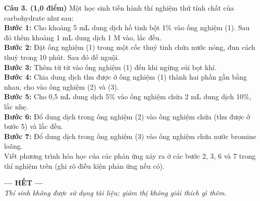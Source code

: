 \documentclass[11pt,a4paper]{article}
\begin{document}
\vspace{6pt}

\vspace{6pt}
\noindent\textbf{Câu 3. (1,0 điểm)} Một học sinh tiến hành thí nghiệm thử tính chất của carbohydrate như sau:\\
\textbf{Bước 1:} Cho khoảng 5 mL dung dịch hồ tinh bột 1\% vào ống nghiệm (1). Sau đó thêm khoảng 1 mL dung dịch  1 M vào, lắc đều.\\
\textbf{Bước 2:} Đặt ống nghiệm (1) trong một cốc thuỷ tinh chứa nước nóng, đun cách thuỷ trong 10 phút. Sau đó để nguội.\\
\textbf{Bước 3:} Thêm từ từ  vào ống nghiệm (1) đến khi ngừng sủi bọt khí.\\
\textbf{Bước 4:} Chia dung dịch thu được ở ống nghiệm (1) thành hai phần gần bằng nhau, cho vào ống nghiệm (2) và (3).\\
\textbf{Bước 5:} Cho 0,5 mL dung dịch  5\% vào ống nghiệm chứa 2 mL dung dịch  10\%, lắc nhẹ.\\
\textbf{Bước 6:} Đổ dung dịch trong ống nghiệm (2) vào ống nghiệm chứa  (thu được ở bước 5) và lắc đều.\\
\textbf{Bước 7:} Đổ dung dịch trong ống nghiệm (3) vào ống nghiệm chứa nước bromine loãng.\\
Viết phương trình hóa học của các phản ứng xảy ra ở các bước 2, 3, 6 và 7 trong thí nghiệm trên (ghi rõ điều kiện phản ứng nếu có).

\vspace{6pt}

\vspace{8pt}
\begin{center}
\textbf{--- HẾT ---} \\
\textit{\small Thí sinh không được sử dụng tài liệu; giám thị không giải thích gì thêm.}
\end{center}
\end{document}
